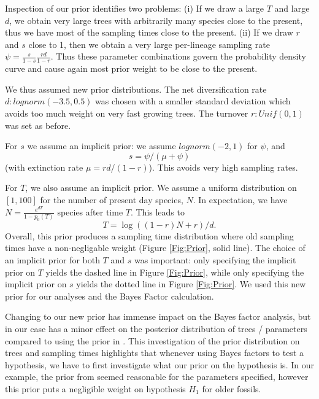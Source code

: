 \documentclass[11pt]{article}
\begin{document}
Inspection of our prior identifies two problems: (i) If we draw a large   $T$ and large $d$, we obtain very large trees with arbitrarily many species close to the present, thus we have most of the sampling times close to the present. (ii) If we draw $r$ and $s$ close to 1, then we obtain a very large per-lineage  sampling rate $\psi=\frac{s}{1-s} \frac{rd}{1-r}$. Thus these parameter combinations govern the probability density curve and cause again most prior weight to be close to the present.

We thus assumed new prior distributions. The net diversification rate $d: lognorm(-3.5,0.5)$ was chosen with a  smaller standard deviation which avoids  too much weight on very fast growing trees. The turnover $r: Unif(0,1)$ was set as before. 

For $s$ we assume an implicit prior: we assume $lognorm(-2,1)$ for $\psi$, and $$s=\psi/(\mu+\psi)$$ (with extinction rate $\mu = r d /(1-r)$). This avoids very high sampling rates.

For $T$, we also assume an implicit prior. We assume a uniform distribution on $[1,100]$ for the number of present day species, $N$. In expectation, we have $N=  \frac{e^{d T}}{1-p_0(T)}$ species after time $T$. This leads to $$T=\log((1-r)N +r)/d.$$
Overall, this prior produces a sampling time distribution where old sampling times have a non-negligable weight (Figure \ref{Fig:Prior}, solid line). 
The choice of an implicit prior for both $T$ and $s$ was important: only specifying the implicit prior on $T$ yields the dashed line in Figure \ref{Fig:Prior}, while only specifying the implicit prior on $s$ yields the dotted line in Figure \ref{Fig:Prior}.
We used this new prior for our  analyses and the Bayes Factor calculation.

Changing to our new prior has immense impact on the Bayes factor analysis, but in our case has a minor effect on the posterior distribution of trees / parameters compared to using the prior in  \cite{gavryushkina2015bayesian}.
This investigation of the prior distribution on trees and sampling times highlights that whenever using Bayes factors to test a hypothesis, we have to first investigate what our prior on the hypothesis is. In our example, the  prior from \cite{gavryushkina2015bayesian} seemed reasonable for the parameters specified, however this prior puts a negligible weight on hypothesis $H_1$ for older fossils.
\end{document}
